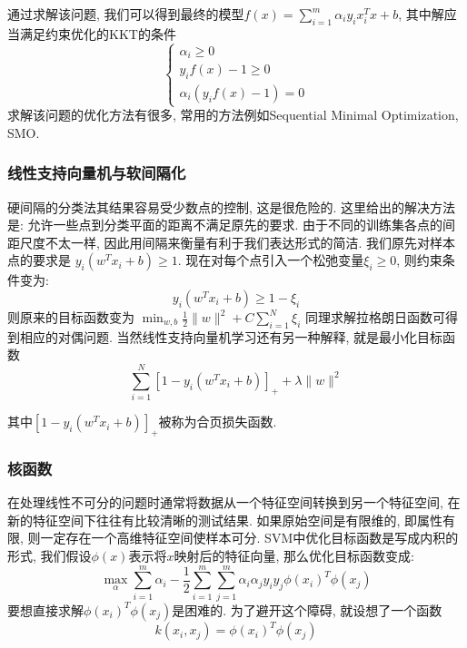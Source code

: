 \documentclass[lang=cn, 11pt,   a4paper]{elegantpaper}
\begin{document}
通过求解该问题,  我们可以得到最终的模型$f (x)=\sum_{i=1}^{m} \alpha_{i} y_{i} x_{i}^{T} x+b$,  其中解应当满足约束优化的KKT的条件
\begin{equation}
\left\{\begin{array}{rl}
{\alpha_{i} \geq 0} \\
{y_{i} f (x)-1 \geq 0} \\
{\alpha_{i}\left (y_{i} f (x)-1\right)=0}
\end{array} \right.
\end{equation}
求解该问题的优化方法有很多,  常用的方法例如Sequential Minimal Optimization,  SMO.

\subsubsection{线性支持向量机与软间隔化}
硬间隔的分类法其结果容易受少数点的控制, 这是很危险的. 这里给出的解决方法是: 允许一些点到分类平面的距离不满足原先的要求. 由于不同的训练集各点的间距尺度不太一样, 因此用间隔来衡量有利于我们表达形式的简洁. 我们原先对样本点的要求是 $y_{i}\left (w^{T} x_{i}+b\right) \geq 1$. 现在对每个点引入一个松弛变量$\xi_i\ge 0$, 则约束条件变为: 
\begin{equation}
y_{i}\left (w^{T} x_{i}+b\right) \geq 1-\xi_{i}	
\end{equation}
则原来的目标函数变为
$\min _{w,  b} \frac{1}{2}\|w\|^{2}+C \sum_{i=1}^{N} \xi_{i}$
同理求解拉格朗日函数可得到相应的对偶问题. 当然线性支持向量机学习还有另一种解释, 就是最小化目标函数
\begin{equation}
\sum_{i=1}^{N}\left[1-y_{i}\left (w^{T} x_{i}+b\right)\right]_{+}+\lambda\|w\|^{2}
\end{equation}

其中$\left[1-y_{i}\left (w^{T} x_{i}+b\right)\right]_{+}$被称为合页损失函数. 

\subsubsection{核函数}
在处理线性不可分的问题时通常将数据从一个特征空间转换到另一个特征空间, 在新的特征空间下往往有比较清晰的测试结果. 如果原始空间是有限维的, 即属性有限, 则一定存在一个高维特征空间使样本可分. SVM中优化目标函数是写成内积的形式, 我们假设$\phi (x)$表示将$x$映射后的特征向量, 那么优化目标函数变成: 
\begin{equation}
\max _{\alpha} \sum_{i=1}^{m} \alpha_{i}-\frac{1}{2} \sum_{i=1}^{m} \sum_{j=1}^{m} \alpha_{i} \alpha_{j} y_{i} y_{j} \phi\left (x_{i}\right)^{T} \phi\left (x_{j}\right)
\end{equation}
要想直接求解$\phi\left (x_{i}\right)^{T} \phi\left (x_{j}\right)$是困难的. 为了避开这个障碍, 就设想了一个函数$$k\left (x_{i},  x_{j}\right)=\phi\left (x_{i}\right)^{T} \phi\left (x_{j}\right)$$
\end{document}
